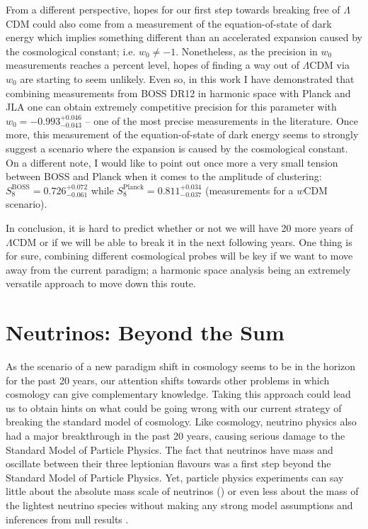 \qquad From a different perspective, hopes for our first step towards breaking free of $\Lambda$CDM could also come from a measurement of the equation-of-state of dark energy which implies something different than an accelerated expansion caused by the cosmological constant; i.e. $w_0 \neq -1$. Nonetheless, as the precision in $w_0$ measurements reaches a percent level, hopes of finding a way out of $\Lambda$CDM via $w_0$ are starting to seem unlikely. Even so, in this work I have demonstrated that combining measurements from BOSS DR12 in harmonic space with Planck and JLA one can obtain extremely competitive precision for this parameter with $w_0 = -0.993^{+0.046}_{-0.043}$ -- one of the most precise measurements in the literature. Once more,  this measurement of the equation-of-state of dark energy seems to strongly suggest a scenario where the expansion is caused by the cosmological constant. On a different note, I would like to point out once more a very small tension between BOSS and Planck when it comes to the amplitude of clustering: $S_8^{\text{BOSS}} = 0.726_{-0.061}^{+0.072}$ while $S_8^{\text{Planck}} = 0.811_{-0.037}^{+0.034}$ (measurements for a $w$CDM scenario).

\qquad In conclusion, it is hard to predict whether or not we will have 20 more years of $\Lambda$CDM or if we will be able to break it in the next following years. One thing is for sure, combining different cosmological probes will be key if we want to move away from the current paradigm; a harmonic space analysis being an extremely versatile approach to move down this route.


\section{Neutrinos: Beyond the Sum}
\label{sec:conclusion:sec2}
As the scenario of a new paradigm shift in cosmology seems to be in the horizon for the past 20 years, our attention shifts towards other problems in which cosmology can give complementary knowledge. Taking this approach could lead us to obtain hints on what could be going wrong with our current strategy of breaking the standard model of cosmology. Like cosmology, neutrino physics also had a major breakthrough in the past 20 years, causing serious damage to the Standard Model of Particle Physics. The fact that neutrinos have mass and oscillate between their three leptionian flavours was a first step beyond the Standard Model of Particle Physics. Yet, particle physics experiments can say little about the absolute mass scale of neutrinos (\NM) or even less about the mass of the lightest neutrino species without making any strong model assumptions and inferences from null results \citep{2016KamLANDMajorana}.

